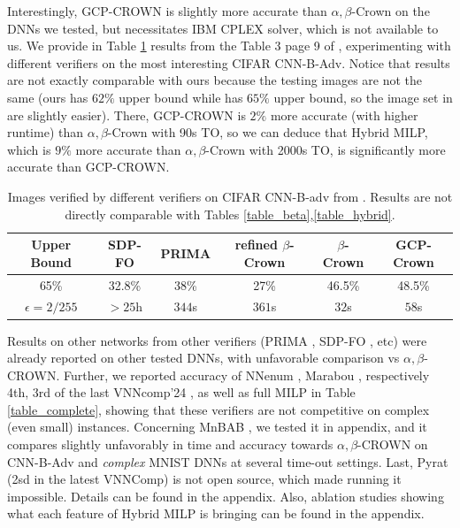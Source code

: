 Interestingly, GCP-CROWN \cite{cutting} is slightly more accurate than $\alpha,\beta$-Crown on the DNNs we tested, but necessitates IBM CPLEX solver, which is not available to us.
We provide in Table \ref{table_gcp} results from the Table 3 page 9 of \cite{cutting}, experimenting with different verifiers on the most interesting CIFAR CNN-B-Adv. Notice that results are not exactly comparable with ours because the testing images are not the same (ours has $62\%$ upper bound while \cite{cutting} has $65\%$ upper bound, so the image set in \cite{cutting} are slightly easier). There, GCP-CROWN is $2\%$ more accurate (with higher runtime) than $\alpha,\beta$-Crown with 90s TO, so we can deduce that Hybrid MILP, which is $9\%$ more accurate than $\alpha,\beta$-Crown with 2000s TO, is significantly more accurate than GCP-CROWN.

\begin{table}[t!]
	\centering
	\begin{tabular}{||c||c|c|c|c|c||}
		\hline
		Upper Bound & SDP-FO & PRIMA & refined $\beta$-Crown & $\beta$-Crown & GCP-Crown \\  \hline
		65\% & 32.8\% & 38\% & 27\% & 46.5\% & 48.5\% \\
		$\epsilon = 2/255$ & $>25$h & $344$s & $361$s & $32$s &  $58$s  \\  \hline
	\end{tabular}
	\caption{Images verified by different verifiers on CIFAR CNN-B-adv from \cite{cutting}.
	Results are not directly comparable with Tables \ref{table_beta},\ref{table_hybrid}.}
	\label{table_gcp}
	\vspace{-0.3cm}
\end{table}


Results on other networks from other verifiers (PRIMA \cite{prima}, SDP-FO \cite{SDPFI}, etc) were already reported \cite{crown} on other tested DNNs, with unfavorable comparison vs $\alpha,\beta$-CROWN. Further, we reported accuracy of NNenum \cite{nnenum}, Marabou \cite{Marabou,Marabou2}, respectively 4th, 3rd of the last VNNcomp'24 \cite{VNNcomp24}, as well as full MILP \cite{MILP} in Table \ref{table_complete}, showing that these verifiers are not competitive on complex (even small) instances. Concerning MnBAB \cite{ferrari2022complete}, we tested it in appendix, and it compares slightly unfavorably in time and accuracy towards $\alpha,\beta$-CROWN on CNN-B-Adv and {\em complex} MNIST DNNs at several time-out settings. Last, Pyrat \cite{pyrat} (2sd in the latest VNNComp) is not open source, which made running it impossible. Details can be found in the appendix. Also, ablation studies showing what each feature of Hybrid MILP is bringing can be found in the appendix.


